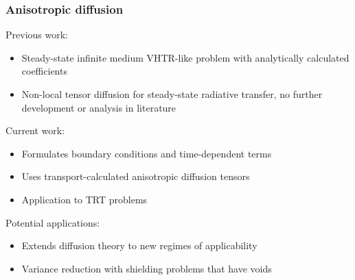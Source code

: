 \documentclass[draft]{beamer}
\begin{document}
\begin{frame}
  \frametitle{Anisotropic diffusion}
  Previous work:
  \begin{itemize}
    \item Steady-state infinite medium VHTR-like problem with analytically
      calculated coefficients \cite{Lar2009c}
    \item Non-local tensor diffusion \cite{Mor2007} for steady-state
      radiative transfer, no further development or analysis in literature
  \end{itemize}
  Current work:
  \begin{itemize}
    \item Formulates boundary conditions and time-dependent terms
    \item Uses transport-calculated anisotropic diffusion tensors
    \item Application to TRT problems
  \end{itemize}
  Potential applications:
  \begin{itemize}
    \item Extends diffusion theory to new regimes of applicability
    \item Variance reduction with shielding problems that have voids
  \end{itemize}
\end{frame}

\end{document}
